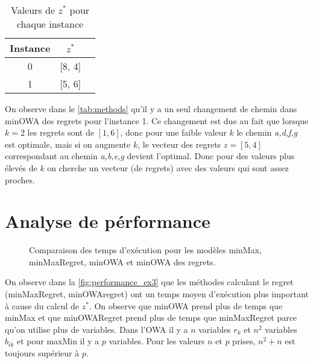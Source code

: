 \documentclass[10pt,a4paper]{report}
\begin{document}
\begin{table}[h!]
\centering
\begin{tabular}{|c|c|c|}
\hline
Instance & \( z^* \) \\
\hline
0 & [8, 4] \\
1 & [5, 6] \\
\hline
\end{tabular}
\caption{Valeurs de \( z^* \) pour chaque instance}
\label{tab:z_star}
\end{table}
On observe dans le \autoref{tab:methods} qu'il y a un seul changement de chemin dans minOWA des regrets pour l'instance 1. Ce changement est due au fait que lorsque $k=2$ les regrets sont de $[1,6]$, donc pour une faible valeur $k$ le chemin \textit{a,d,f,g} est optimale, mais si on augmente $k$, le vecteur des regrets $z=[5,4]$ correspondant au chemin \textit{a,b,e,g} devient l'optimal. Donc pour des valeurs plus élevés de $k$ on cherche un vecteur (de regrets) avec des valeurs qui sont assez proches.

\section{Analyse de pérformance}
\begin{figure}[h!]
    \centering
      
    \caption{Comparaison des temps d'exécution pour les modèles minMax, minMaxRegret, minOWA et minOWA des regrets.}
    \label{fig:performance_ex3}
\end{figure}
On observe dans la \autoref{fig:performance_ex3} que les méthodes calculant le regret (minMaxRegret, minOWAregret) ont un temps moyen d'exécution plus important à cause du calcul de $z^*$. On observe que minOWA prend plus de temps que minMax et que minOWARegret prend plus de temps que minMaxRegret parce qu'on utilise plus de variables. Dans l'OWA il y a $n$ variables $r_k$ et $n^2$ variables $b_{ik}$ et pour maxMin il y a $p$ variables. Pour les valeurs $n$ et $p$ prises, $n^2+n$ est toujours supérieur à $p$.
\end{document}

